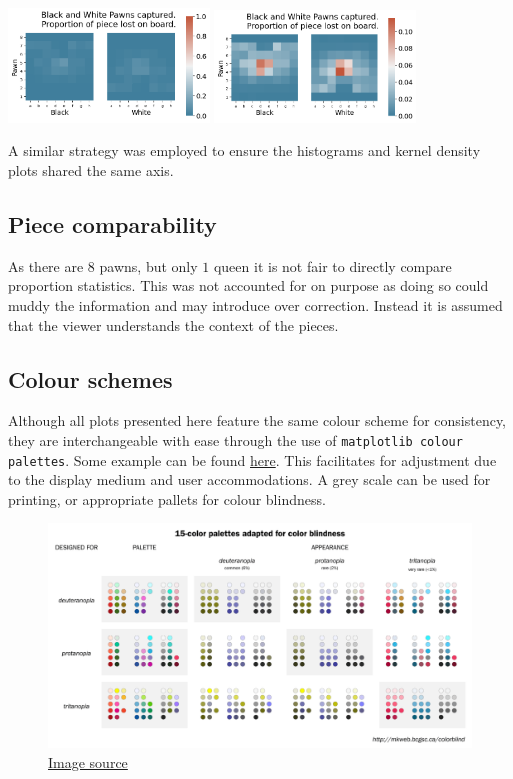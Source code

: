 \documentclass[11pt]{article}
\begin{document}
\begin{center}
\includegraphics[width=0.4\textwidth]{Images/DaenaliaEvandruile_HEATMAP_Pawn_WHITE_EXAMPLE_1_WITH_WRONG_COLOUR.png}
\includegraphics[width=0.4\textwidth]{Images/_HEATMAP_Pawn_FISC.png}
\end{center}
A similar strategy was employed to ensure the histograms and kernel density plots shared the same axis.

\newpage
\subsection{Piece comparability}
\label{sec:orga4be1a2}
As there are \(8\) pawns, but only \(1\) queen it is not fair to directly compare proportion statistics. This was not accounted for on purpose as doing so could muddy the information and may introduce over correction. Instead it is assumed that the viewer understands the context of the pieces.
\subsection{Colour schemes}
\label{sec:org8abaedb}
Although all plots presented here feature the same colour scheme for consistency, they are interchangeable with ease through the use of \texttt{matplotlib colour palettes}. Some example can be found \href{https://seaborn.pydata.org/tutorial/color\_palettes.html}{here}. This facilitates for adjustment due to the display medium and user accommodations. A grey scale can be used for printing, or appropriate pallets for colour blindness.

\begin{figure}[htbp]
\centering
\includegraphics[width=\textwidth]{Images/color-blind-friendly-palette-9.png}
\caption{\href{https://mkweb.bcgsc.ca/colorblind/}{Image source}}
\end{figure}
\end{document}
